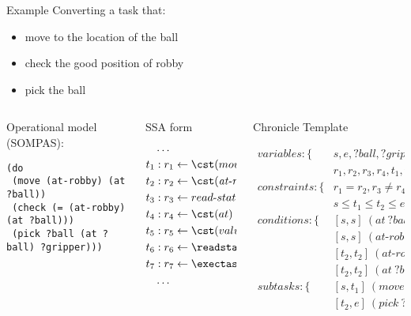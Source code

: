 \begin{frame}[c,fragile]{Example}
    \small
    Converting a task that:
\begin{itemize}
    \item move to the location of the ball
    \item check the good position of robby
    \item pick the ball
\end{itemize}
    \begin{columns}[c, T]
        \begin{column}{0.32\textwidth}
            Operational model (SOMPAS):
            \tiny
            \begin{lstlisting}
(do
 (move (at-robby) (at ?ball))
 (check (= (at-robby) (at ?ball)))
 (pick ?ball (at ?ball) ?gripper)))
         \end{lstlisting} 
        \end{column}


        \begin{column}{0.32\textwidth}
            SSA form
            \tiny
            \begin{align*}
                & \dots \\
        t_1 &: r_1 \leftarrow \cst(move) \\
        t_2 &: r_2 \leftarrow \cst(\textit{at-robby}) \\
        t_3 &: r_3 \leftarrow read\text{-}state(r_2) \\
        t_4 &: r_4 \leftarrow \cst(at) \\
        t_5 &: r_5 \leftarrow \cst(value(?ball)) \\
        t_6 &: r_6 \leftarrow \readstate(r_4, r_5) \\
        t_7 &: r_7 \leftarrow \exectask(r_1, r_3, r_6) \\ 
            & \dots\\
            \end{align*}
        \end{column}
        \begin{column}{0.32\textwidth}
        Chronicle Template
        
\tiny
\begin{align*}
    variables: \{&s,e,?ball,?gripper,\\
    &r_1,r_2,r_3,r_4,t_1,t_2\} \\
    constraints : \{ &r_1 = r_2, r_3 \neq r_4, \\
        & s \leq t_1 \leq t_2 \leq e \}\\
    conditions : \{&[s,s]~(at\ ?ball) = r_1 \\
        &[s,s]~(at\text{-}robby) = r_2 \\
        &[t_2,t_2]~(at\text{-}robby) = r_3 \\
        &[t_2,t_2]~(at\ ?ball) = r_4 \} \\
    subtasks : \{ &[s,t_1]~(move\ r_2\ r_1) \\
        &[t_2,e]~(pick\ ?ball\ r_4\ ?gripper)\}
\end{align*}  
        \end{column}
    \end{columns}
\end{frame}
